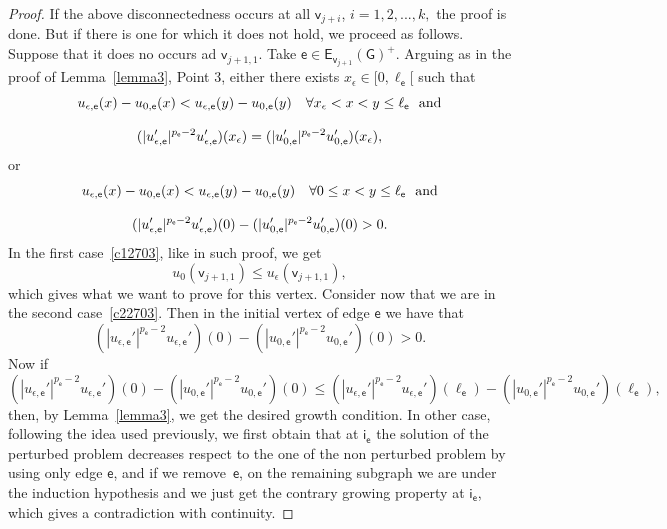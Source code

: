 \documentclass[reqno,12pt]{amsart}
\def\e{\mathsf{e}} 	%
\def\v{\mathsf{v}}	%
\newcommand{\vi}{\mathsf{i}} %
\newcommand{\G}{\mathsf{G}}	%
\newcommand{\E}{\mathsf{E}}	%
\numberwithin{equation}{section} %
\begin{document}
\begin{proof}
If the above disconnectedness occurs at all $\v_{j+i}$, $i=1,2,...,k,$ the proof is done. But if there is one for which it does not hold, we proceed as follows. Suppose that it does no occurs ad $\v_{j+1,1}$. Take $\e\in \E_{\v_{j+1}}(\G)^+$. Arguing as in the proof of Lemma~\ref{lemma3}, Point 3, either there exists $x_\epsilon\in [0,\ell_{\e}[$ such that
\begin{equation}\label{c12703}\begin{array}{c}\displaystyle u_{\epsilon,\e}(x)-u_{0,\e}(x)< u_{\epsilon,\e}(y)-u_{0,\e}(y)\quad\forall x_\epsilon< x<y\le\ell_{\e} \ \hbox{ and} \\ \\
\displaystyle(|u_{\epsilon,\e}'|^{p_{\e}-2}u_{\epsilon,\e}')(x_\epsilon)=(|u_{0,\e}'|^{p_{\e}-2}u_{0,\e}')(x_\epsilon),
\end{array}
\end{equation}
or 
\begin{equation}\label{c22703}\begin{array}{c}\displaystyle u_{\epsilon,\e}(x)-u_{0,\e}(x)< u_{\epsilon,\e}(y)-u_{0,\e}(y)\quad\forall 0\le x<y\le\ell_{\e} \ \hbox{ and} \\ \\
\displaystyle(|u_{\epsilon,\e}'|^{p_{\e}-2}u_{\epsilon,\e}')(0)-(|u_{0,\e}'|^{p_{\e}-2}u_{0,\e}')(0)>0.
\end{array}
\end{equation}
  In the first case~\eqref{c12703}, like in such proof, we get %
$$u_0(\v_{j+1,1}) \le u_\epsilon(\v_{j+1,1}),$$
which gives what we want to prove for this vertex. Consider now that we are in the second case~\eqref{c22703}. Then in the initial vertex of edge
$\e$ we have that
$$(|u_{\epsilon,\e}'|^{p_{\e}-2}u_{\epsilon,\e}')(0)-(|u_{0,\e}'|^{p_{\e}-2}u_{0,\e}')(0)>0.$$
Now if 
$$(|u_{\epsilon,\e}'|^{p_{\e}-2}u_{\epsilon,\e}')(0)-(|u_{0,\e}'|^{p_{\e}-2}u_{0,\e}')(0)\le (|u_{\epsilon,\e}'|^{p_{\e}-2}u_{\epsilon,\e}') (\ell_{\e}) -  
  (|u_{0,\e}'|^{p_{\e}-2}u_{0,\e}')(\ell_{\e}),$$
then, by Lemma~\ref{lemma3}, we get the desired growth condition. In other case, following the idea used previously, we
first obtain that at $\vi_\e$ the solution of the perturbed problem decreases respect to the one of the non perturbed problem by using only edge $\e$, and if we remove~$\e$, on the remaining subgraph we are under the induction hypothesis and we just get the contrary growing property at $\vi_\e$, which gives a contradiction with continuity. 
\end{proof}
\end{document}
